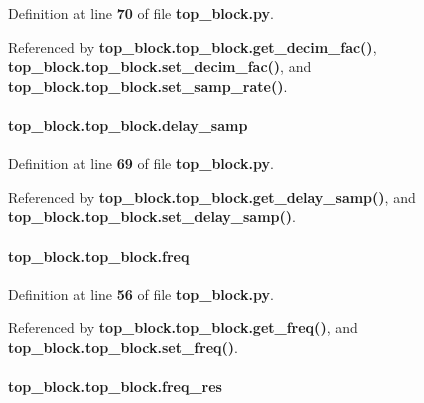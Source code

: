 Definition at line {\bf 70} of file {\bf top\+\_\+block.\+py}.



Referenced by {\bf top\+\_\+block.\+top\+\_\+block.\+get\+\_\+decim\+\_\+fac()}, {\bf top\+\_\+block.\+top\+\_\+block.\+set\+\_\+decim\+\_\+fac()}, and {\bf top\+\_\+block.\+top\+\_\+block.\+set\+\_\+samp\+\_\+rate()}.

\paragraph[{delay\+\_\+samp}]{\setlength{\rightskip}{0pt plus 5cm}top\+\_\+block.\+top\+\_\+block.\+delay\+\_\+samp}\label{classtop__block_1_1top__block_afcb355225efe38eed2721c7077e728da}


Definition at line {\bf 69} of file {\bf top\+\_\+block.\+py}.



Referenced by {\bf top\+\_\+block.\+top\+\_\+block.\+get\+\_\+delay\+\_\+samp()}, and {\bf top\+\_\+block.\+top\+\_\+block.\+set\+\_\+delay\+\_\+samp()}.

\paragraph[{freq}]{\setlength{\rightskip}{0pt plus 5cm}top\+\_\+block.\+top\+\_\+block.\+freq}\label{classtop__block_1_1top__block_a90b08f0bee348b579ec8ab8e7911a051}


Definition at line {\bf 56} of file {\bf top\+\_\+block.\+py}.



Referenced by {\bf top\+\_\+block.\+top\+\_\+block.\+get\+\_\+freq()}, and {\bf top\+\_\+block.\+top\+\_\+block.\+set\+\_\+freq()}.

\paragraph[{freq\+\_\+res}]{\setlength{\rightskip}{0pt plus 5cm}top\+\_\+block.\+top\+\_\+block.\+freq\+\_\+res}\label{classtop__block_1_1top__block_a65ad81d1499a68255cdb3100d980e98a}


